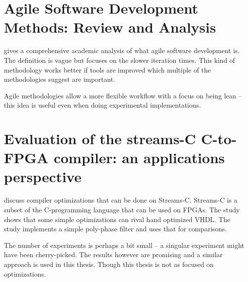 \cite{src:HLSandOpt}

\section{Agile Software Development Methods: Review and Analysis}
\citeauthor{src:Agile} gives a comprehensive academic analysis of what agile software development is. The definition is vague but focuses on the slower iteration times. This kind of methodology works better if tools are improved which multiple of the methodologies suggest are important. \cite{src:Agile}

Agile methodologies allow a more flexible workflow with a focus on being lean -- this idea is useful even when doing experimental implementations.

\section{Evaluation of the streams-C C-to-FPGA compiler: an applications perspective}
\citeauthor{src:ConFPGA} discuss compiler optimizations that can be done on Streams-C. Streams-C is a subset of the C-programming language that can be used on FPGAs. The study shows that some simple optimizations can rival hand optimized VHDL. The study implements a simple poly-phase filter and uses that for comparisons. \cite{src:ConFPGA}

The number of experiments is perhaps a bit small -- a singular experiment might have been cherry-picked. The results however are promising and a similar approach is used in this thesis. Though this thesis is not as focused on optimizations.


